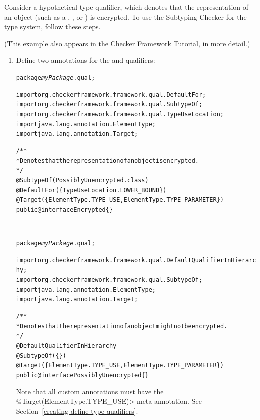 \label{encrypted-example}

Consider a hypothetical  type qualifier, which denotes that the
representation of an object (such as a , , or
) is encrypted. To use the Subtyping Checker for the 
type system, follow these steps.

(This example also appears in the
\href{https://checkerframework.org/tutorial/webpages/encryption-checker-cmd.html}{Checker
  Framework Tutorial}, in more detail.)

\begin{enumerate}
\item
Define two annotations for the  and  qualifiers:

\begin{alltt}
package \textit{myPackage}.qual;

import org.checkerframework.framework.qual.DefaultFor;
import org.checkerframework.framework.qual.SubtypeOf;
import org.checkerframework.framework.qual.TypeUseLocation;
import java.lang.annotation.ElementType;
import java.lang.annotation.Target;

/**
 * Denotes that the representation of an object is encrypted.
 */
@SubtypeOf(PossiblyUnencrypted.class)
@DefaultFor(\{TypeUseLocation.LOWER_BOUND\})
@Target(\{ElementType.TYPE_USE, ElementType.TYPE_PARAMETER\})
public @interface Encrypted \{\}
\end{alltt}

~

\begin{alltt}
package \textit{myPackage}.qual;

import org.checkerframework.framework.qual.DefaultQualifierInHierarchy;
import org.checkerframework.framework.qual.SubtypeOf;
import java.lang.annotation.ElementType;
import java.lang.annotation.Target;

/**
 * Denotes that the representation of an object might not be encrypted.
 */
@DefaultQualifierInHierarchy
@SubtypeOf(\{\})
@Target(\{ElementType.TYPE_USE, ElementType.TYPE_PARAMETER\})
public @interface PossiblyUnencrypted \{\}
\end{alltt}

Note that all custom annotations must have the
\<@Target(ElementType.TYPE\_USE)> meta-annotation.
See Section~\ref{creating-define-type-qualifiers}.


\end{enumerate}
